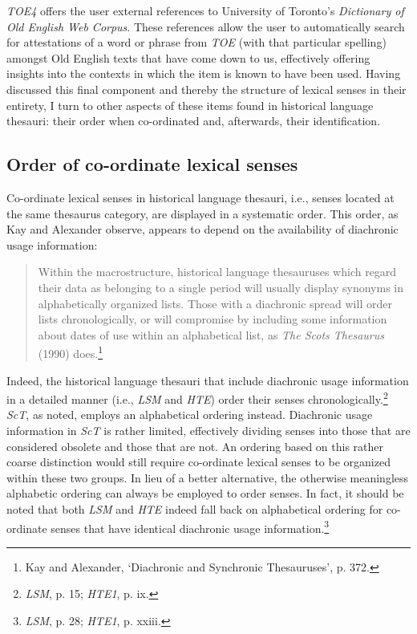 \textit{TOE4} offers the user external references to University of Toronto's \textit{Dictionary of Old English Web Corpus}. These references allow the user to automatically search for attestations of a word or phrase from \textit{TOE} (with that particular spelling) amongst Old English texts that have come down to us, effectively offering insights into the contexts in which the item is known to have been used. %
Having discussed this final component and thereby the structure of lexical senses in their entirety, I turn to other aspects of these items found in historical language thesauri: their order when co-ordinated and, afterwards, their identification.


\subsection{Order of co-ordinate lexical senses}

Co-ordinate lexical senses in historical language thesauri, i.e., senses located at the same thesaurus category, 
are displayed in a systematic order. This order, as Kay and Alexander observe, appears to depend on the availability of diachronic usage information:
\begin{quotation} \noindent
  Within the macrostructure, historical language thesauruses which regard their data as belonging to a single period will usually display synonyms in alphabetically organized lists. Those with a diachronic spread will order lists chronologically, or will compromise by including some information about dates of use within an alphabetical list, as \textit{The Scots Thesaurus} (1990) does.\footnote{Kay and Alexander, `Diachronic and Synchronic Thesauruses', p. 372.} 
\end{quotation}
Indeed, the historical language thesauri that include diachronic usage information in a detailed manner (i.e., \textit{LSM} and \textit{HTE}) order their senses chronologically.\footnote{\textit{LSM}, p. 15; \textit{HTE1}, p. ix.} \textit{ScT}, as noted, employs an alphabetical ordering instead. Diachronic usage information in \textit{ScT} is rather limited, effectively dividing senses into those that are considered obsolete and those that are not. An ordering based on this rather coarse distinction would still require co-ordinate lexical senses to be organized within these two groups. In lieu of a better alternative, the otherwise meaningless alphabetic ordering can always be employed to order senses. In fact, it should be noted that both \textit{LSM} and \textit{HTE} indeed fall back on alphabetical ordering for co-ordinate senses that have identical diachronic usage information.\footnote{\textit{LSM}, p. 28; \textit{HTE1}, p. xxiii.}


